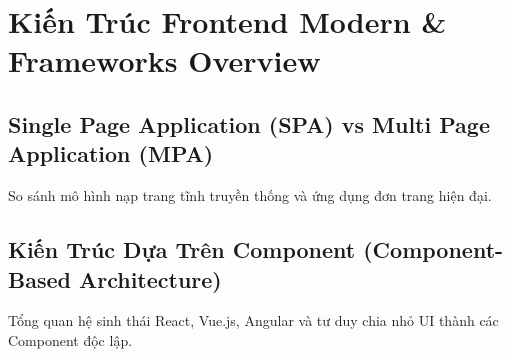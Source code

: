 \chapter{Kiến Trúc Frontend Modern \& Frameworks Overview}
\label{chap:frontend_architecture}

\section{Single Page Application (SPA) vs Multi Page Application (MPA)}
So sánh mô hình nạp trang tĩnh truyền thống và ứng dụng đơn trang hiện đại.

\section{Kiến Trúc Dựa Trên Component (Component-Based Architecture)}
Tổng quan hệ sinh thái React, Vue.js, Angular và tư duy chia nhỏ UI thành các Component độc lập.
